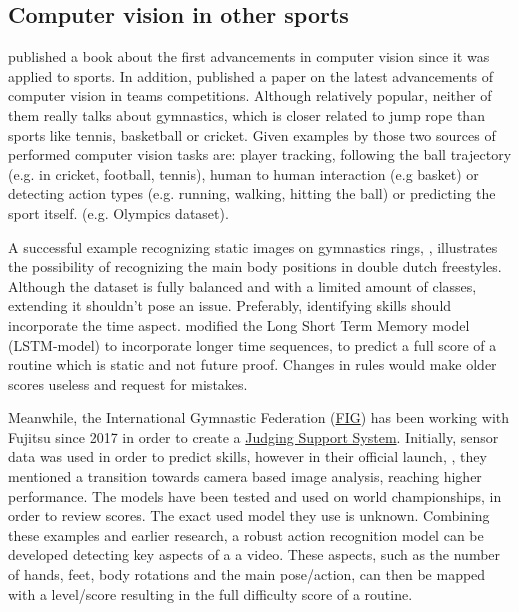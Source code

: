 \subsection{Computer vision in other sports}
\label{lit:computer-vision-sports}

\textcite{Soomro_2014} published a book about the first advancements in computer vision since it was applied to sports. In addition, \textcite{Yin_2024} published a paper on the latest advancements of computer vision in teams competitions. Although relatively popular, neither of them really talks about gymnastics, which is closer related to jump rope than sports like tennis, basketball or cricket.
Given examples by those two sources of performed computer vision tasks are: player tracking, following the ball trajectory (e.g. in cricket, football, tennis), human to human interaction (e.g basket) or detecting action types (e.g. running, walking, hitting the ball) or predicting the sport itself. (e.g. Olympics dataset).

A successful example recognizing static images on gymnastics rings, \textcite{Abdullah_2023}, illustrates the possibility of recognizing the main body positions in double dutch freestyles. Although the dataset is fully balanced and with a limited amount of classes, extending it shouldn't pose an issue. Preferably, identifying skills should incorporate the time aspect.
\textcite{Zahan_2023} modified the Long Short Term Memory model (LSTM-model) to incorporate longer time sequences, to predict a full score of a routine which is static and not future proof. Changes in rules would make older scores useless and request for mistakes.

Meanwhile, the International Gymnastic Federation (\href{https://www.gymnastics.sport/site/}{FIG}) has been working with Fujitsu since 2017 in order to create a \href{https://www.fujitsu.com/global/themes/data-driven/judging-support-system/}{Judging Support System}. Initially, sensor data was used in order to predict skills, however in their official launch, \autocite{Fujitsu2023launch}, they mentioned a transition towards camera based image analysis, reaching higher performance. The models have been tested and used on world championships, in order to review scores. The exact used model they use is unknown.
Combining these examples and earlier research, a robust action recognition model can be developed detecting key aspects of a a video. These aspects, such as the number of hands, feet, body rotations and the main pose/action, can then be mapped with a level/score resulting in the full difficulty score of a routine.

